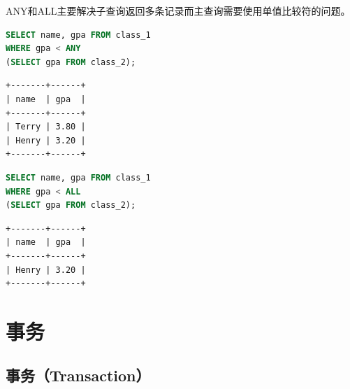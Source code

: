 \documentclass[12pt, openany, oneside]{book}
\begin{document}
ANY和ALL主要解决子查询返回多条记录而主查询需要使用单值比较符的问题。

\begin{table}[H]
	\centering
	\caption{ANY \& ALL}
\end{table}


\begin{lstlisting}[language=SQL]
SELECT name, gpa FROM class_1
WHERE gpa < ANY
(SELECT gpa FROM class_2);
\end{lstlisting}

\begin{tcolorbox}
\begin{verbatim}
+-------+------+
| name  | gpa  |
+-------+------+
| Terry | 3.80 |
| Henry | 3.20 |
+-------+------+
	\end{verbatim}
\end{tcolorbox}

\vspace{0.5cm}


\begin{lstlisting}[language=SQL]
SELECT name, gpa FROM class_1
WHERE gpa < ALL
(SELECT gpa FROM class_2);
\end{lstlisting}

\begin{tcolorbox}
\begin{verbatim}
+-------+------+
| name  | gpa  |
+-------+------+
| Henry | 3.20 |
+-------+------+
	\end{verbatim}
\end{tcolorbox}

\newpage

\chapter{事务}

\section{事务（Transaction）}
\end{document}
